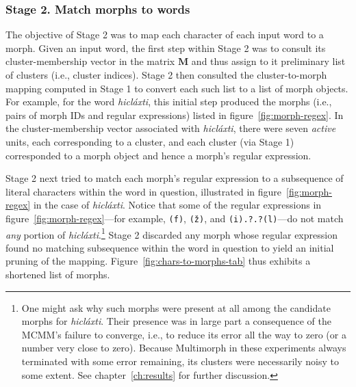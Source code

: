 {\subsubsection{Stage 2. Match morphs to words}
 
The objective of Stage 2 was to map each character of each input word to a morph.
Given an input word, the first step within Stage 2 was to consult its 
cluster-membership vector in the matrix $\mathbf{M}$ 
and thus assign to it preliminary list 
of clusters (i.e., cluster indices).  
Stage 2 then consulted the cluster-to-morph mapping computed in 
Stage 1 to convert each such list to a list of morph objects.
For example, for the word \textit{hicl\'{a}xti},
this initial step produced the morphs (i.e., pairs of morph IDs and regular expressions)  listed in 
figure~\ref{fig:morph-regex}. In the cluster-membership vector associated with 
\textit{hicl\'{a}xti}, there were seven \emph{active} units, each 
corresponding to a cluster, and each cluster (via Stage 1) corresponded to a morph object and hence
a morph's regular expression. 


Stage 2 next tried to match each morph's regular expression to a subsequence of
literal characters within the word in question, 
illustrated in figure~\ref{fig:morph-regex}
in the case of \textit{hicl\'{a}xti}. 
Notice that some of the regular expressions in figure~\ref{fig:morph-regex}---for example,
\texttt{(f)}, \texttt{(\v{z})}, and \texttt{(i).?.?(l)}---do not
match \emph{any} portion of \textit{hicl\'{a}xti}.\footnote{One might ask 
why such morphs were present at all among the 
candidate morphs for \textit{hicl\'{a}xti}.  Their presence was in large part a 
consequence of the MCMM's failure to converge, i.e., to reduce its error all the 
way to zero (or a number very close to zero). Because Multimorph in these 
experiments always terminated with some error remaining, its clusters 
were necessarily noisy to some extent. See chapter~\ref{ch:results} for 
further discussion.}
Stage 2 discarded any morph whose regular expression found no matching subsequence 
within the word in question to yield an initial pruning of the mapping.  
Figure~\ref{fig:chars-to-morphs-tab} thus exhibits a shortened list of morphs.

}

